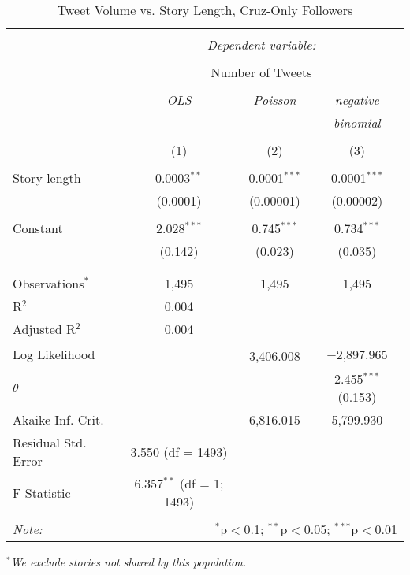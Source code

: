 \begin{table}[!htbp] \centering 
  \caption{Tweet Volume vs. Story Length, Cruz-Only Followers} 
  \label{} 
    \begin{tabular}{@{\extracolsep{5pt}}lccc} 
    \\[-1.8ex]\hline 
    \hline \\[-1.8ex] 
     & \multicolumn{3}{c}{\textit{Dependent variable:}} \\ 
    \cline{2-4} 
    \\[-1.8ex] & \multicolumn{3}{c}{Number of Tweets} \\ 
    \\[-1.8ex] & \textit{OLS} & \textit{Poisson} & \textit{negative} \\ 
     & \textit{} & \textit{} & \textit{binomial} \\ 
    \\[-1.8ex] & (1) & (2) & (3)\\ 
    \hline \\[-1.8ex] 
     Story length & 0.0003$^{**}$ & 0.0001$^{***}$ & 0.0001$^{***}$ \\ 
      & (0.0001) & (0.00001) & (0.00002) \\ 
      & & & \\ 
     Constant & 2.028$^{***}$ & 0.745$^{***}$ & 0.734$^{***}$ \\ 
      & (0.142) & (0.023) & (0.035) \\ 
      & & & \\ 
    \hline \\[-1.8ex] 
    Observations$^{*}$ & 1,495 & 1,495 & 1,495 \\ 
    R$^{2}$ & 0.004 &  &  \\ 
    Adjusted R$^{2}$ & 0.004 &  &  \\ 
    Log Likelihood &  & $-$3,406.008 & $-$2,897.965 \\ 
    $\theta$ &  &  & 2.455$^{***}$  (0.153) \\ 
    Akaike Inf. Crit. &  & 6,816.015 & 5,799.930 \\ 
    Residual Std. Error & 3.550 (df = 1493) &  &  \\ 
    F Statistic & 6.357$^{**}$ (df = 1; 1493) &  &  \\ 
    \hline 
    \hline \\[-1.8ex] 
    \textit{Note:}  & \multicolumn{3}{r}{$^{*}$p$<$0.1; $^{**}$p$<$0.05; $^{***}$p$<$0.01} \\ 
    \end{tabular} 
\end{table}
\emph{$^{*}$We exclude stories not shared by this population.} 
\newpage 


